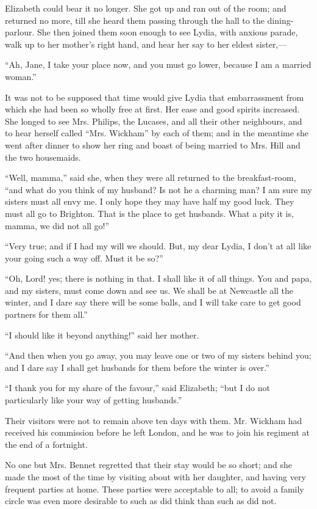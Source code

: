 \documentclass[12pt]{book}
\begin{document}
Elizabeth could bear it no longer. She got up and ran out of the room; and returned no more, till she heard them passing through the hall to the dining-parlour. She then joined them soon enough to see Lydia, with anxious parade, walk up to her mother's right hand, and hear her say to her eldest sister,---

``Ah, Jane, I take your place now, and you must go lower, because I am a married woman.''

It was not to be supposed that time would give Lydia that embarrassment from which she had been so wholly free at first. Her ease and good spirits increased. She longed to see Mrs. Philips, the Lucases, and all their other neighbours, and to hear herself called ``Mrs. Wickham'' by each of them; and in the meantime she went after dinner to show her ring and boast of being married to Mrs. Hill and the two housemaids.

``Well, mamma,'' said she, when they were all returned to the breakfast-room, ``and what do you think of my husband? Is not he a charming man? I am sure my sisters must all envy me. I only hope they may have half my good luck. They must all go to Brighton. That is the place to get husbands. What a pity it is, mamma, we did not all go!''

``Very true; and if I had my will we should. But, my dear Lydia, I don't at all like your going such a way off. Must it be so?''

``Oh, Lord! yes; there is nothing in that. I shall like it of all things. You and papa, and my sisters, must come down and see us. We shall be at Newcastle all the winter, and I dare say there will be some balls, and I will take care to get good partners for them all.''

``I should like it beyond anything!'' said her mother.

``And then when you go away, you may leave one or two of my sisters behind you; and I dare say I shall get husbands for them before the winter is over.''

``I thank you for my share of the favour,'' said Elizabeth; ``but I do not particularly like your way of getting husbands.''

Their visitors were not to remain above ten days with them. Mr. Wickham had received his commission before he left London, and he was to join his regiment at the end of a fortnight.

No one but Mrs. Bennet regretted that their stay would be so short; and she made the most of the time by visiting about with her daughter, and having very frequent parties at home. These parties were acceptable to all; to avoid a family circle was even more desirable to such as did think than such as did not.
\end{document}
